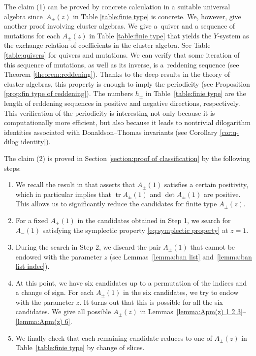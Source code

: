 \documentclass[pdftex]{sigma}
\numberwithin{equation}{section}
\theoremstyle{definition}
\DeclareMathOperator{\tr}{tr}
\begin{document}
The claim (1) can be proved by concrete calculation in a suitable universal algebra
since~$A_\pm (z)$ in Table \ref{table:finie type} is concrete.
We, however, give another proof involving cluster algebras.
We give a~quiver and a sequence of mutations for each $A_\pm (z)$ in Table \ref{table:finie type}
that yields the $Y$-system as the exchange relation of coefficients
in the cluster algebra. See Table \ref{table:quivers} for quivers and mutations.
We can verify that some iteration of this sequence of mutations, as well as its inverse, is a~reddening sequence (see Theorem \ref{theorem:reddening}).
Thanks to the deep results in the theory of cluster algebras,
this property is enough to imply the periodicity (see Proposition \ref{prop:fin type of reddening}).
The numbers $h_\pm$ in Table~\ref{table:finie type} are the length of reddening sequences
in positive and negative directions, respectively.
This verification of the periodicity is interesting not only because it is computationally more efficient,
but also because it leads to nontrivial dilogarithm identities associated with
Donaldson--Thomas invariants (see Corollary \ref{cor:q-dilog identity}).

The claim (2) is proved in Section \ref{section:proof of classification} by the following steps:
\begin{enumerate}[label=Step \arabic*., leftmargin=*, itemindent=3em]\itemsep=0pt
 \item We recall the result in \cite{mizuno2020difference} that
 asserts that $A_\pm(1)$ satisfies a certain positivity,
 which in particular implies that $\tr A_\pm (1)$ and $\det A_\pm(1)$
 are positive. This allows us to significantly reduce the candidates for finite type $A_\pm(z)$.
 \item For a fixed $A_+(1)$ in the candidates obtained in Step 1, we search for $A_-(1)$
 satisfying the symplectic property \eqref{eq:symplectic property} at $z=1$.
 \item During the search in Step 2, we discard the pair $A_\pm (1)$ that cannot be endowed with
 the parameter $z$ (see Lemmas~\ref{lemma:ban list} and~\ref{lemma:ban list indec}).
 \item At this point, we have six candidates up to a permutation of the indices
 and a change of sign. For each $A_\pm(1)$ in the six candidates, we try to endow with the
 parameter $z$. It turns out that this is possible for all the six candidates.
 We give all possible $A_\pm(z)$ in Lemmas~\ref{lemma:Apm(z) 1 2 3}--\ref{lemma:Apm(z) 6}.
 \item We finally check that each remaining candidate reduces to one of $A_\pm (z)$ in
 Table~\ref{table:finie type} by change of slices.
\end{enumerate}
\end{document}
